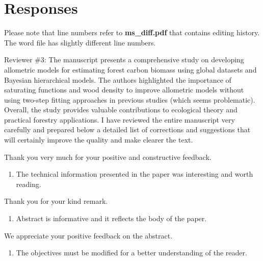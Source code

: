 \documentclass[
  12pt,
  letterpaper,
  DIV=11,
  numbers=noendperiod]{scrartcl}
\providecommand{\tightlist}{%
  \setlength{\itemsep}{0pt}\setlength{\parskip}{0pt}}\usepackage{longtable,booktabs,array}
\renewenvironment{quote}
  {\begin{customblockquote}\color{blockquote-text}\ignorespaces}
  {\end{customblockquote}}
\begin{document}
\newpage

\section{Responses}\label{responses}

Please note that line numbers refer to \textbf{ms\_diff.pdf} that
contains editing history. The word file has slightly different line
numbers.

\begin{quote}
Reviewer \#3: The manuscript presents a comprehensive study on
developing allometric models for estimating forest carbon biomass using
global datasets and Bayesian hierarchical models. The authors
highlighted the importance of saturating functions and wood density to
improve allometric models without using two-step fitting approaches in
previous studies (which seems problematic). Overall, the study provides
valuable contributions to ecological theory and practical forestry
applications. I have reviewed the entire manuscript very carefully and
prepared below a detailed list of corrections and suggestions that will
certainly improve the quality and make clearer the text.
\end{quote}

Thank you very much for your positive and constructive feedback.

\begin{quote}
\begin{enumerate}
\def\labelenumi{\arabic{enumi})}
\tightlist
\item
  The technical information presented in the paper was interesting and
  worth reading.
\end{enumerate}
\end{quote}

Thank you for your kind remark.

\begin{quote}
\begin{enumerate}
\def\labelenumi{\arabic{enumi})}
\setcounter{enumi}{1}
\tightlist
\item
  Abstract is informative and it reflects the body of the paper.
\end{enumerate}
\end{quote}

We appreciate your positive feedback on the abstract.

\begin{quote}
\begin{enumerate}
\def\labelenumi{\arabic{enumi})}
\setcounter{enumi}{2}
\tightlist
\item
  The objectives must be modified for a better understanding of the
  reader.
\end{enumerate}
\end{quote}
\end{document}

